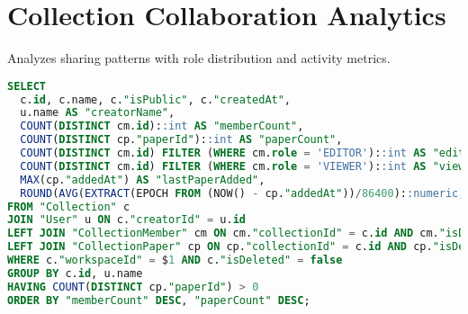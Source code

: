 \section{Collection Collaboration Analytics}
Analyzes sharing patterns with role distribution and activity metrics.
\begin{lstlisting}[language=SQL]
SELECT
  c.id, c.name, c."isPublic", c."createdAt",
  u.name AS "creatorName",
  COUNT(DISTINCT cm.id)::int AS "memberCount",
  COUNT(DISTINCT cp."paperId")::int AS "paperCount",
  COUNT(DISTINCT cm.id) FILTER (WHERE cm.role = 'EDITOR')::int AS "editorCount",
  COUNT(DISTINCT cm.id) FILTER (WHERE cm.role = 'VIEWER')::int AS "viewerCount",
  MAX(cp."addedAt") AS "lastPaperAdded",
  ROUND(AVG(EXTRACT(EPOCH FROM (NOW() - cp."addedAt"))/86400)::numeric, 1) AS "avgPaperAgeDays"
FROM "Collection" c
JOIN "User" u ON c."creatorId" = u.id
LEFT JOIN "CollectionMember" cm ON cm."collectionId" = c.id AND cm."isDeleted" = false
LEFT JOIN "CollectionPaper" cp ON cp."collectionId" = c.id AND cp."isDeleted" = false
WHERE c."workspaceId" = $1 AND c."isDeleted" = false
GROUP BY c.id, u.name
HAVING COUNT(DISTINCT cp."paperId") > 0
ORDER BY "memberCount" DESC, "paperCount" DESC;
\end{lstlisting}
